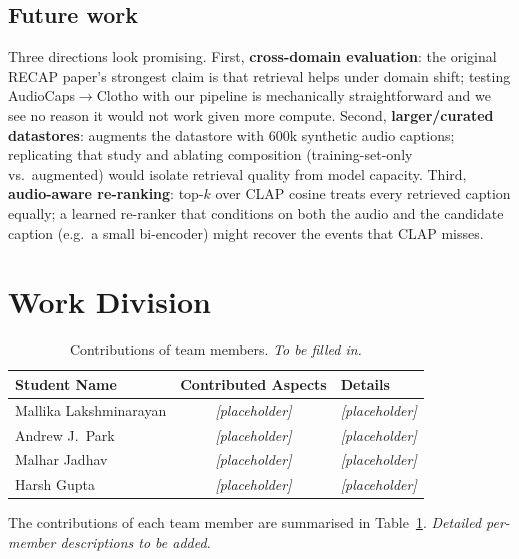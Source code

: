 \documentclass[10pt,twocolumn,letterpaper]{article}
\begin{document}
\subsection{Future work}
Three directions look promising. First, \textbf{cross-domain evaluation}:
the original RECAP paper's strongest claim is that retrieval helps under
domain shift; testing AudioCaps$\rightarrow$Clotho with our pipeline is
mechanically straightforward and we see no reason it would not work given
more compute. Second, \textbf{larger/curated datastores}: \cite{ghosh2024recap}
augments the datastore with $600$k synthetic audio captions; replicating that
study and ablating composition (training-set-only vs.\ augmented) would
isolate retrieval quality from model capacity. Third, \textbf{audio-aware
re-ranking}: top-$k$ over CLAP cosine treats every retrieved caption equally;
a learned re-ranker that conditions on both the audio and the candidate
caption (e.g.\ a small bi-encoder) might recover the events that CLAP misses.

\newpage
\section{Work Division}

\begin{table}[t]
\begin{center}
\begin{tabular}{|l|c|p{8.5cm}|}
\hline
Student Name & Contributed Aspects & Details \\
\hline\hline
Mallika Lakshminarayan & \emph{[placeholder]} & \emph{[placeholder]} \\
Andrew J.\ Park        & \emph{[placeholder]} & \emph{[placeholder]} \\
Malhar Jadhav          & \emph{[placeholder]} & \emph{[placeholder]} \\
Harsh Gupta            & \emph{[placeholder]} & \emph{[placeholder]} \\
\hline
\end{tabular}
\end{center}
\caption{Contributions of team members. \emph{To be filled in.}}
\label{tab:contributions}
\end{table}

The contributions of each team member are summarised in
Table~\ref{tab:contributions}. \emph{Detailed per-member descriptions to be
added.}


{\small


}
\end{document}
